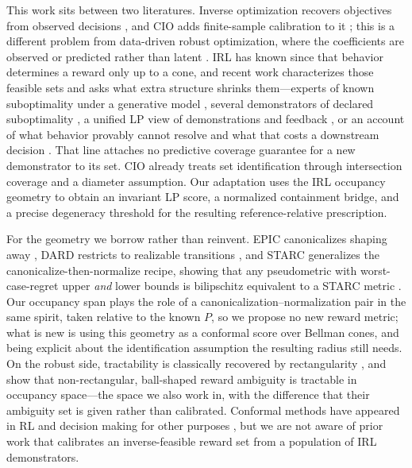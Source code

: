 \documentclass{article}
\begin{document}
This work sits between two literatures. Inverse
optimization recovers objectives from observed decisions
\citep{ahuja2001inverse,chan2018inverse}, and CIO adds finite-sample
calibration to it \citep{lin2024conformal}; this is a different problem from
data-driven robust optimization, where the coefficients are observed or
predicted rather than latent
\citep{chenreddy2022datadriven,sun2023predictthencalibrate}. IRL has known
since \citet{ng2000algorithms} that behavior determines a reward only up to a
cone, and recent work characterizes those feasible sets and asks what extra
structure shrinks them---experts of known suboptimality under a generative
model \citep{poiani2024suboptimal}, several demonstrators of declared
suboptimality \citep{kim2026feasible}, a unified LP view of demonstrations and
feedback \citep{kim2024unified}, or an account of what behavior provably cannot
resolve \citep{skalse2023invariance} and what that costs a downstream decision
\citep{lazzati2025robustness}. That line
attaches no predictive coverage guarantee for a new demonstrator to its set.
CIO already treats set identification through intersection coverage and a
diameter assumption. Our adaptation uses the IRL occupancy geometry to obtain
an invariant LP score, a normalized containment bridge, and a precise
degeneracy threshold for the resulting reference-relative prescription.

For the geometry we borrow rather than reinvent. EPIC canonicalizes shaping away \citep{gleave2021epic}, DARD
restricts to realizable transitions \citep{wulfe2022dard}, and STARC generalizes
the canonicalize-then-normalize recipe, showing that any pseudometric with
worst-case-regret upper \emph{and} lower bounds is bilipschitz equivalent to a
STARC metric
\citep{skalse2024starc}. Our occupancy span plays the role of a
canonicalization--normalization pair in the same spirit, taken relative to the
known $P$, so we propose no new reward metric; what is new is using
this geometry as a conformal score over Bellman cones, and being explicit about
the identification assumption the resulting radius still needs. On the robust
side, tractability is classically recovered by rectangularity
\citep{iyengar2005robust,nilim2005robust,wiesemann2013robust}, and
\citet{gadot2024solving} show that non-rectangular, ball-shaped reward
ambiguity is tractable in occupancy space---the space we also work in, with the difference
that their ambiguity set is given rather than calibrated. Conformal methods
have appeared in RL and decision making for other purposes \citep{gupta2023cammarl,
pan2026uncertaintyaware,zhou2025calibrating}, but we are not aware of prior
work that calibrates an inverse-feasible reward set from a population of IRL
demonstrators.
\end{document}
